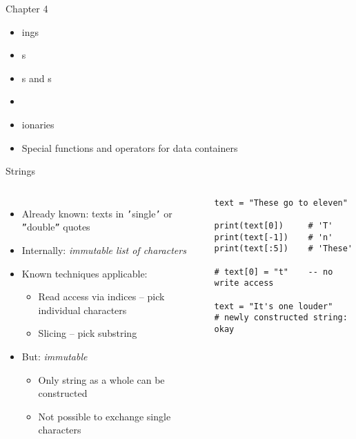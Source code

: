 
\begin{frame}[t,plain]
\titlepage
\end{frame}


\begin{frame}[fragile]{Chapter 4}
%
\begin{itemize}
\item {}ings
\item {}s
\item {}s and s
\item {}
\item {}ionaries
\item Special functions and operators for data containers
\end{itemize}
%
\end{frame}


\begin{frame}[fragile]{Strings}
%
\begin{columns}[T]
\begin{itemize}
\item Already known: texts in \texttt{'}single\texttt{'} or \texttt{''}double\texttt{''} quotes
\item Internally: \emph{immutable list of characters}
\item Known techniques applicable:
	\begin{itemize}
	\item Read access via indices -- pick individual characters
	\item Slicing -- pick substring
	\end{itemize}
\item But: \emph{immutable}
	\begin{itemize}
	\item Only string as a whole can be constructed
	\item Not possible to exchange single characters
	\end{itemize}
\end{itemize}
%
\begin{codebox}
\begin{verbatim}
text = "These go to eleven"

print(text[0])     # 'T'
print(text[-1])    # 'n'
print(text[:5])    # 'These'

# text[0] = "t"    -- no write access

text = "It's one louder" 
# newly constructed string: okay
\end{verbatim}
\end{codebox}
\end{columns}
%
\end{frame}

